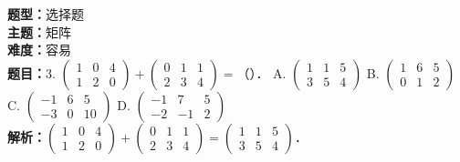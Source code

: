 \documentclass{ctexart}
\newenvironment{question}[5]{%
	\noindent\textbf{题型：}#1\\
	\textbf{主题：}#2\\
	\textbf{难度：}#3\\
	\textbf{题目：}#4\\
	\textbf{解析：}#5\\
	\vspace{1em}
}{}
\begin{document}
	\begin{question}
		{选择题}
		{矩阵}
		{容易}
		{3. \(\left(\begin{array}{lll}1 & 0 & 4 \\ 1 & 2 & 0\end{array}\right)+\left(\begin{array}{lll}0 & 1 & 1 \\ 2 & 3 & 4\end{array}\right)=\)（）．
			A. \(\left(\begin{array}{lll}1 & 1 & 5 \\ 3 & 5 & 4\end{array}\right)\)
			B. \(\left(\begin{array}{lll}1 & 6 & 5 \\ 0 & 1 & 2\end{array}\right)\)
			C. \(\left(\begin{array}{ccc}-1 & 6 & 5 \\ -3 & 0 & 10\end{array}\right)\)
			D. \(\left(\begin{array}{ccc}-1 & 7 & 5 \\ -2 & -1 & 2\end{array}\right)\)}
		{\(\left(\begin{array}{lll}1 & 0 & 4 \\ 1 & 2 & 0\end{array}\right)+\left(\begin{array}{lll}0 & 1 & 1 \\ 2 & 3 & 4\end{array}\right)=\left(\begin{array}{lll}1 & 1 & 5 \\ 3 & 5 & 4\end{array}\right)\)．}
	\end{question}
	
\end{document}
